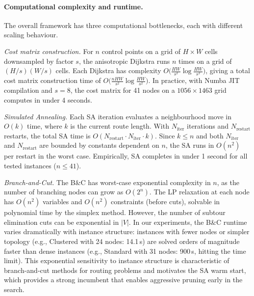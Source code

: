 \documentclass[11pt,a4paper]{article}
\begin{document}
\paragraph{Computational complexity and runtime.}
The overall framework has three computational bottlenecks, each with different scaling behaviour.

\emph{Cost matrix construction.}
For $n$ control points on a grid of $H \times W$ cells downsampled by factor $s$, the anisotropic Dijkstra runs $n$ times on a grid of $(H/s)(W/s)$ cells.
Each Dijkstra has complexity $O\bigl(\frac{HW}{s^2} \log \frac{HW}{s^2}\bigr)$, giving a total cost matrix construction time of $O\bigl(\frac{nHW}{s^2} \log \frac{HW}{s^2}\bigr)$.
In practice, with Numba JIT compilation and $s = 8$, the cost matrix for 41 nodes on a $1056 \times 1463$ grid computes in under 4 seconds.

\emph{Simulated Annealing.}
Each SA iteration evaluates a neighbourhood move in $O(k)$ time, where $k$ is the current route length.
With $N_{\text{iter}}$ iterations and $N_{\text{restart}}$ restarts, the total SA time is $O(N_{\text{restart}} \cdot N_{\text{iter}} \cdot k)$.
Since $k \leq n$ and both $N_{\text{iter}}$ and $N_{\text{restart}}$ are bounded by constants dependent on $n$, the SA runs in $O(n^2)$ per restart in the worst case.
Empirically, SA completes in under 1 second for all tested instances ($n \leq 41$).

\emph{Branch-and-Cut.}
The B\&C has worst-case exponential complexity in $n$, as the number of branching nodes can grow as $O(2^n)$.
The LP relaxation at each node has $O(n^2)$ variables and $O(n^2)$ constraints (before cuts), solvable in polynomial time by the simplex method.
However, the number of subtour elimination cuts can be exponential in $|V|$.
In our experiments, the B\&C runtime varies dramatically with instance structure:
instances with fewer nodes or simpler topology (e.g., Clustered with 24 nodes: 14.1\,s) are solved orders of magnitude faster than dense instances (e.g., Standard with 31 nodes: 900\,s, hitting the time limit).
This exponential sensitivity to instance structure is characteristic of branch-and-cut methods for routing problems and motivates the SA warm start, which provides a strong incumbent that enables aggressive pruning early in the search.
\end{document}
